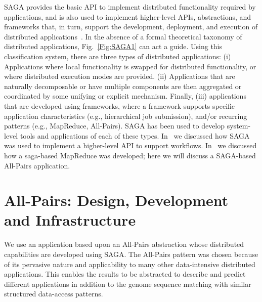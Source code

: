 \documentclass{rspublic}
\begin{document}
SAGA provides the basic API to implement distributed functionality
required by applications, and is also used to implement higher-level
APIs, abstractions, and frameworks that, in turn, support the
development, deployment, and execution of distributed
applications~\citep{saga_gmac09}. In the absence of a formal
theoretical taxonomy of distributed applications, Fig.~\ref{Fig:SAGA1}
can act a guide. Using this classification system, there are three
types of distributed applications: (i) Applications where local
functionality is swapped for distributed functionality, or where
distributed execution modes are provided.  (ii) Applications that are
naturally decomposable or have multiple components are then aggregated
or coordinated by some unifying or explicit mechanism.  Finally, (iii)
applications that are developed using frameworks, where a
framework %
supports specific application characteristics (e.g., hierarchical job
submission), and/or recurring patterns (e.g., MapReduce, All-Pairs).
SAGA has been used to develop system-level tools and applications of
each of these types.  In~\cite{saga_montage_escience09} we discussed
how SAGA was used to implement a higher-level API to support
workflows.  In~\cite{saga_ccgrid09} we discussed how a saga-based
MapReduce was developed; here we will discuss a SAGA-based All-Pairs
application.



\vspace{-0.5cm}

\section{All-Pairs: Design, Development and Infrastructure} We use an
application based upon an All-Pairs abstraction whose distributed
capabilities are developed using SAGA. The All-Pairs pattern was
chosen because of its pervasive nature and applicability to many other
data-intensive distributed applications. This enables the results to
be abstracted to describe and predict different applications in
addition to the genome sequence matching with similar structured
data-access patterns.
\end{document}
